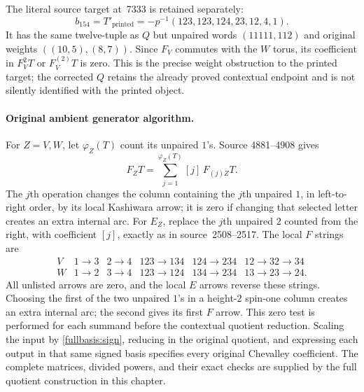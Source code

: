 The literal source target at~7333 is retained separately:
\[
 b_{154}=T'_{\mathrm{printed}}
 =-p^{-1}(123,123,124,23,12,4,1).
\]
It has the same twelve-tuple as $Q$ but unpaired words $(11111,112)$
and original weights $((10,5),(8,7))$.  Since $F_V$ commutes with
the $W$ torus, its coefficient in $F_V^2T$ or $F_V^{(2)}T$ is zero.
This is the precise weight obstruction to the printed target; the
corrected $Q$ retains the already proved contextual endpoint and is
not silently identified with the printed object.

\paragraph{Original ambient generator algorithm.}
For $Z=V,W$, let $\varphi_Z(T)$ count its unpaired $1$'s.  Source
4881--4908 gives
\[
 F_ZT=\sum_{j=1}^{\varphi_Z(T)}[j]\,F_{(j)Z}T.
\]
The $j$th operation changes the column containing the $j$th unpaired
$1$, in left-to-right order, by its local Kashiwara arrow; it is zero
if changing that selected letter creates an extra internal arc.  For
$E_Z$, replace the $j$th unpaired $2$ counted from the right, with
coefficient $[j]$, exactly as in source~2508--2517.  The local $F$
strings are
\[
\begin{array}{c|ccccc}
V&1\to3&2\to4&123\to134&124\to234&12\to32\to34\\
W&1\to2&3\to4&123\to124&134\to234&13\to23\to24.
\end{array}
\]
All unlisted arrows are zero, and the local $E$ arrows reverse these
strings.  Choosing the first of the two unpaired $1$'s in a height-$2$
spin-one column creates an extra internal arc; the second gives its
first $F$ arrow.  This zero test is performed for each summand before
the contextual quotient reduction.  Scaling the input by
\eqref{fullbasis:sign}, reducing in the original quotient, and expressing
each output in that same signed basis specifies every original
Chevalley coefficient.  The complete matrices, divided powers, and
their exact checks are supplied by the full quotient construction in
this chapter.
